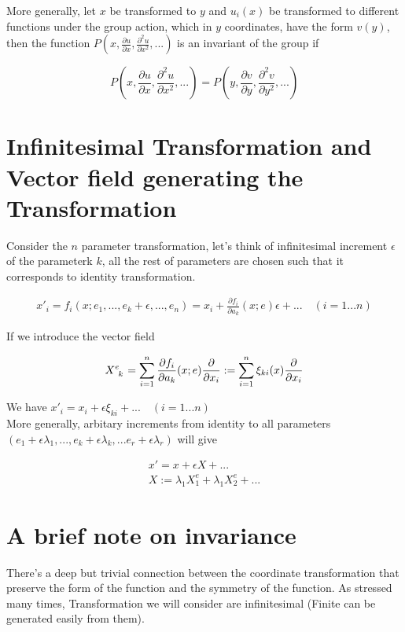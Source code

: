 \documentclass{report}
\begin{document}
\noindent More generally, let $x$ be transformed to $y$ and $u_i(x)$ be transformed to different functions under the group action, which in $y$ coordinates, have the form $v(y)$, then the function $P(x,\frac{\partial u}{\partial x}, \frac{\partial ^2 u}{\partial x^2},...)$ is an invariant of the group if 

$$ P\left(x,\frac{\partial u}{\partial x}, \frac{\partial ^2 u}{\partial x^2},...\right) = P\left(y,\frac{\partial v}{\partial y}, \frac{\partial ^2 v}{\partial y^2},...\right)$$

\section{Infinitesimal Transformation and Vector field generating the Transformation}

Consider the $n$ parameter transformation, let's think of infinitesimal increment $\epsilon$ of the parameterk $k$, all the rest of parameters are chosen such that it corresponds to identity transformation.

\begin{align}
x'_i = f_i(x;e_1,...,e_k+\epsilon,...,e_n)
= x_i + \frac{\partial f_i}{\partial a_k} (x;e)\epsilon + ... \quad(i = 1...n)
\end{align}

\noindent If we introduce the vector field

$$X\indices{^e_k} = \sum_{i=1}^{n} \frac{\partial f_i}{\partial a_k}(x;e) \frac{\partial}{\partial x_i} := \sum_{i=1}^{n}\xi_{ki}(x)\frac{\partial}{\partial x_i}$$

\noindent We have $x'_i = x_i + \epsilon \xi_{ki} + ... \quad (i=1...n)$\\

\noindent More generally, arbitary increments from identity to all parameters $(e_1 + \epsilon\lambda_1,...,e_k+\epsilon\lambda_k,...e_r+\epsilon\lambda_r)$ will give

\begin{gather}
x' = x + \epsilon X +...\\
X := \lambda_1 X_1^e + \lambda_1 X_2^e+...
\end{gather}

\section{A brief note on invariance}

There's a deep but trivial connection between the coordinate transformation that preserve the form of the function and the symmetry of the function. As stressed many times, Transformation we will consider are infinitesimal (Finite can be generated easily from them).\\
\end{document}
